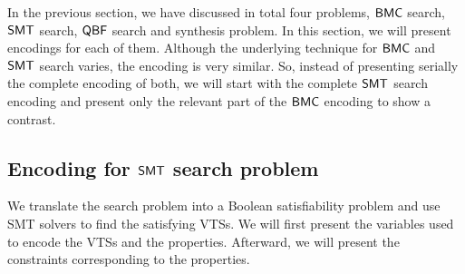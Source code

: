 %
%
%
\noindent In the previous section, we have discussed in total four problems, $\mathsf{BMC}$ search, $\mathsf{SMT}$ search, $\mathsf{QBF}$ search and synthesis problem.
%
In this section, we will present encodings for each of them.
%
Although the underlying technique for $\mathsf{BMC}$ and $\mathsf{SMT}$ search varies, the encoding is very similar. 
%
So, instead of presenting serially the complete encoding of both, we will start with the complete $\mathsf{SMT}$ search encoding and present only the relevant part of the $\mathsf{BMC}$ encoding to show a contrast.

\subsection{Encoding for $\mathsf{SMT}$ search problem}
\label{enc:smt}

\noindent We translate the search problem into a Boolean satisfiability
problem and use SMT solvers to find the satisfying VTSs.
%
We will first present the variables used to encode the
VTSs and the properties.
%
Afterward, we will present the constraints corresponding to the
properties.

